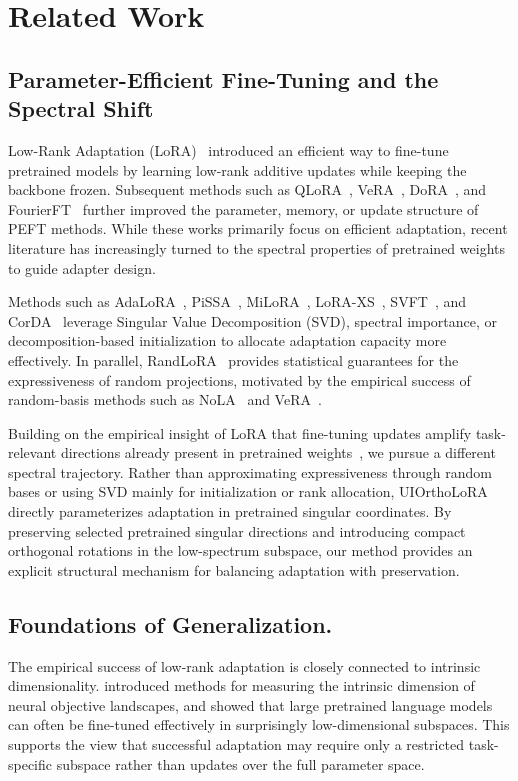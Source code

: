 \documentclass{article}
\begin{document}
\section{Related Work}
\subsection{Parameter-Efficient Fine-Tuning and the Spectral Shift}
Low-Rank Adaptation (LoRA)~\citep{hu2022lora} introduced an efficient way to fine-tune pretrained models by learning low-rank additive updates while keeping the backbone frozen. Subsequent methods such as QLoRA~\citep{dettmers2023qlora}, VeRA~\citep{kopiczko2023vera}, DoRA~\citep{liu2024dora}, and FourierFT~\citep{gao2024parameter} further improved the parameter, memory, or update structure of PEFT methods. While these works primarily focus on efficient adaptation, recent literature has increasingly turned to the spectral properties of pretrained weights to guide adapter design.

Methods such as AdaLoRA~\citep{zhang2023adalora}, PiSSA~\citep{meng2024pissa}, MiLoRA~\citep{wang2025milora}, LoRA-XS~\citep{balazy2024lora}, SVFT~\citep{lingam2024svft}, and CorDA~\citep{yang2024corda} leverage Singular Value Decomposition (SVD), spectral importance, or decomposition-based initialization to allocate adaptation capacity more effectively. In parallel, RandLoRA~\citep{albert2025randlora} provides statistical guarantees for the expressiveness of random projections, motivated by the empirical success of random-basis methods such as NoLA~\citep{koohpayegani2023nola} and VeRA~\citep{kopiczko2023vera}.

Building on the empirical insight of LoRA that fine-tuning updates amplify task-relevant directions already present in pretrained weights~\citep{hu2022lora}, we pursue a different spectral trajectory. Rather than approximating expressiveness through random bases or using SVD mainly for initialization or rank allocation, UIOrthoLoRA directly parameterizes adaptation in pretrained singular coordinates. By preserving selected pretrained singular directions and introducing compact orthogonal rotations in the low-spectrum subspace, our method provides an explicit structural mechanism for balancing adaptation with preservation.

\subsection{Foundations of Generalization.}
The empirical success of low-rank adaptation is closely connected to intrinsic dimensionality. \citet{li2018measuring} introduced methods for measuring the intrinsic dimension of neural objective landscapes, and \citet{aghajanyan2020intrinsic} showed that large pretrained language models can often be fine-tuned effectively in surprisingly low-dimensional subspaces. This supports the view that successful adaptation may require only a restricted task-specific subspace rather than updates over the full parameter space.
\end{document}
